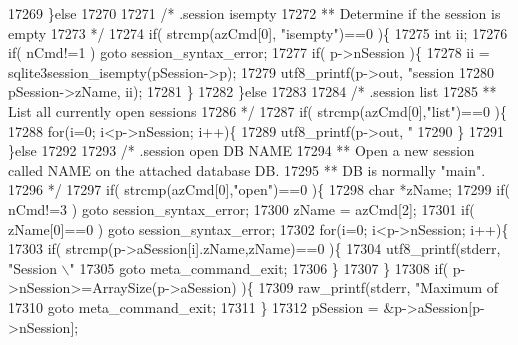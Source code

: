 \begin{DoxyCode}
{{{{{{{{{{{{{{{{{{{{{{{{{{{{{{{{{{{{{{{{{{{{{{{{{{{{{{{{{{{{{{{{{{{{{{{{{{{{{{{{{{{{{{{{{{17269     \}\textcolor{keywordflow}{else}
17270 
17271     \textcolor{comment}{/* .session isempty}
17272 \textcolor{comment}{    ** Determine if the session is empty}
17273 \textcolor{comment}{    */}
17274     \textcolor{keywordflow}{if}( strcmp(azCmd[0], \textcolor{stringliteral}{"isempty"})==0 )\{
17275       \textcolor{keywordtype}{int} ii;
17276       \textcolor{keywordflow}{if}( nCmd!=1 ) \textcolor{keywordflow}{goto} session\_syntax\_error;
17277       \textcolor{keywordflow}{if}( p->nSession )\{
17278         ii = sqlite3session\_isempty(pSession->p);
17279         utf8_printf(p->out, \textcolor{stringliteral}{"session %
17280                     pSession->zName, ii);
17281       \}
17282     \}\textcolor{keywordflow}{else}
17283 
17284     \textcolor{comment}{/* .session list}
17285 \textcolor{comment}{    ** List all currently open sessions}
17286 \textcolor{comment}{    */}
17287     \textcolor{keywordflow}{if}( strcmp(azCmd[0],\textcolor{stringliteral}{"list"})==0 )\{
17288       \textcolor{keywordflow}{for}(i=0; i<p->nSession; i++)\{
17289         utf8_printf(p->out, \textcolor{stringliteral}{"%
17290       \}
17291     \}\textcolor{keywordflow}{else}
17292 
17293     \textcolor{comment}{/* .session open DB NAME}
17294 \textcolor{comment}{    ** Open a new session called NAME on the attached database DB.}
17295 \textcolor{comment}{    ** DB is normally "main".}
17296 \textcolor{comment}{    */}
17297     \textcolor{keywordflow}{if}( strcmp(azCmd[0],\textcolor{stringliteral}{"open"})==0 )\{
17298       \textcolor{keywordtype}{char} *zName;
17299       \textcolor{keywordflow}{if}( nCmd!=3 ) \textcolor{keywordflow}{goto} session\_syntax\_error;
17300       zName = azCmd[2];
17301       \textcolor{keywordflow}{if}( zName[0]==0 ) \textcolor{keywordflow}{goto} session\_syntax\_error;
17302       \textcolor{keywordflow}{for}(i=0; i<p->nSession; i++)\{
17303         \textcolor{keywordflow}{if}( strcmp(p->aSession[i].zName,zName)==0 )\{
17304           utf8_printf(stderr, \textcolor{stringliteral}{"Session \(\backslash\)"%
17305           \textcolor{keywordflow}{goto} meta\_command\_exit;
17306         \}
17307       \}
17308       \textcolor{keywordflow}{if}( p->nSession>=ArraySize(p->aSession) )\{
17309         raw_printf(stderr, \textcolor{stringliteral}{"Maximum of %
17310         \textcolor{keywordflow}{goto} meta\_command\_exit;
17311       \}
17312       pSession = &p->aSession[p->nSession];
}}}}}}}}}}}}}}}}}}}}}}}}}}}}}}}}}}}}}}}}}}}}}}}}}}}}}}}}}}}}}}}}}}}}}}}}}}}}}}}}}}}}}}}}}}}}}}
\end{DoxyCode}

